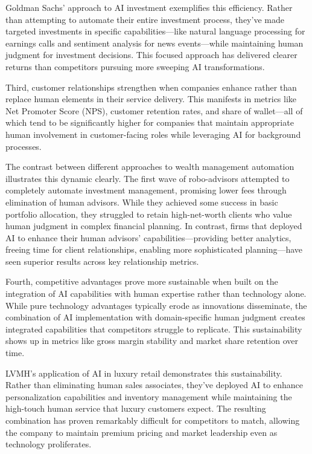 \documentclass[
  Letterpaper,
]{scrbook}
\begin{document}
Goldman Sachs' approach to AI investment exemplifies this efficiency.
Rather than attempting to automate their entire investment process,
they've made targeted investments in specific capabilities---like
natural language processing for earnings calls and sentiment analysis
for news events---while maintaining human judgment for investment
decisions. This focused approach has delivered clearer returns than
competitors pursuing more sweeping AI transformations.

Third, customer relationships strengthen when companies enhance rather
than replace human elements in their service delivery. This manifests in
metrics like Net Promoter Score (NPS), customer retention rates, and
share of wallet---all of which tend to be significantly higher for
companies that maintain appropriate human involvement in customer-facing
roles while leveraging AI for background processes.

The contrast between different approaches to wealth management
automation illustrates this dynamic clearly. The first wave of
robo-advisors attempted to completely automate investment management,
promising lower fees through elimination of human advisors. While they
achieved some success in basic portfolio allocation, they struggled to
retain high-net-worth clients who value human judgment in complex
financial planning. In contrast, firms that deployed AI to enhance their
human advisors' capabilities---providing better analytics, freeing time
for client relationships, enabling more sophisticated planning---have
seen superior results across key relationship metrics.

Fourth, competitive advantages prove more sustainable when built on the
integration of AI capabilities with human expertise rather than
technology alone. While pure technology advantages typically erode as
innovations disseminate, the combination of AI implementation with
domain-specific human judgment creates integrated capabilities that
competitors struggle to replicate. This sustainability shows up in
metrics like gross margin stability and market share retention over
time.

LVMH's application of AI in luxury retail demonstrates this
sustainability. Rather than eliminating human sales associates, they've
deployed AI to enhance personalization capabilities and inventory
management while maintaining the high-touch human service that luxury
customers expect. The resulting combination has proven remarkably
difficult for competitors to match, allowing the company to maintain
premium pricing and market leadership even as technology proliferates.
\end{document}
